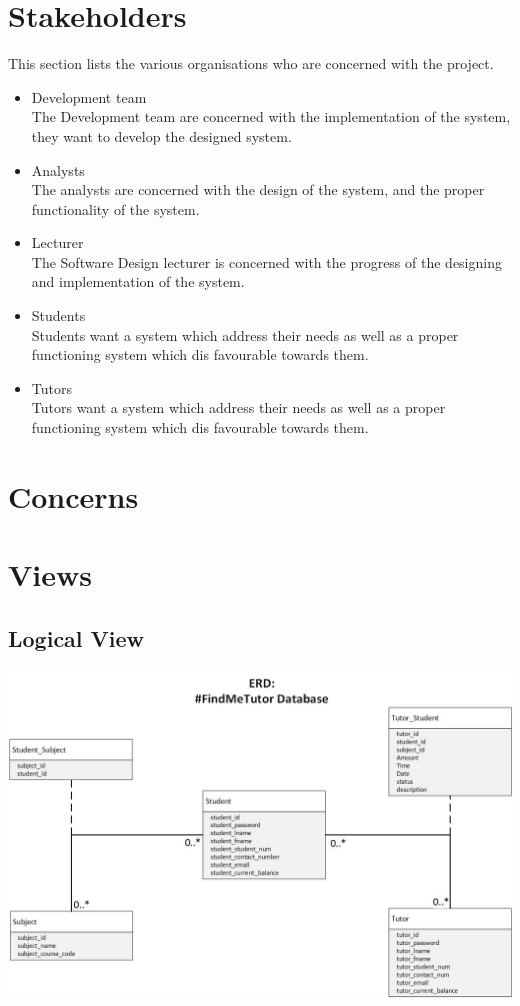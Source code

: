 \documentclass[12pt]{article}
\begin{document}
\section{Stakeholders}
This section lists the various organisations who are concerned with the project.
\begin{itemize}
\item Development team\\
The Development team are concerned with the implementation of the system, they want to develop the designed system. 
\item Analysts\\
The analysts are concerned with the design of the system, and the proper functionality of the system.
\item Lecturer\\
The Software Design lecturer is concerned with the progress of the designing and implementation of the system. 
\item Students\\
Students want a system which address their needs as well as a proper functioning system which dis favourable towards them.
\item Tutors\\
Tutors want a system which address their needs as well as a proper functioning system which dis favourable towards them.
\end{itemize}
\section{Concerns}


\section{Views}
\subsection{Logical View}
\includegraphics[width=140mm]{./class_diagram_findme_tutor.jpg}
\end{document}
